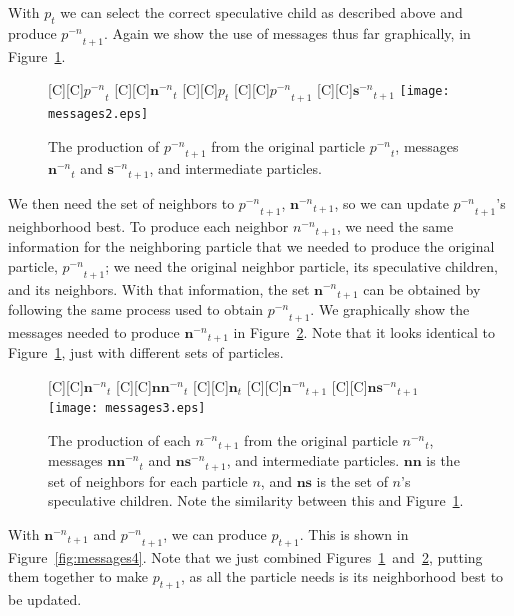 \documentclass[journal,letterpaper]{IEEEtran}
\newcommand{\fig}[1]{Figure~\ref{fig:#1}}
\providecommand{\nonbest}[1]{\ensuremath{#1^{-n}}}
\providecommand{\p}{\ensuremath{p}}
\providecommand{\sset}{\ensuremath{\mathbf{s}}}
\providecommand{\nsset}{\ensuremath{\mathbf{ns}}}
\providecommand{\n}{\ensuremath{n}}
\providecommand{\nset}{\ensuremath{\mathbf{n}}}
\providecommand{\nnset}{\ensuremath{\mathbf{nn}}}
\begin{document}
With $\p_t$ we can select the correct speculative child as described above and
produce $\nonbest{\p}_{t+1}$.  Again we show the use of messages thus far
graphically, in \fig{messages2}.  

\begin{figure}
  \centering
  [C][C]{$\nonbest{\p}_{t}$}
  [C][C]{$\nonbest{\nset}_{t}$}
  [C][C]{$\p_{t}$}
  [C][C]{$\nonbest{\p}_{t+1}$}
  [C][C]{$\nonbest{\sset}_{t+1}$}
  \texttt{[image: messages2.eps]}
  \caption{The production of $\nonbest{\p}_{t+1}$ from the original particle 
  $\nonbest{\p}_{t}$, messages $\nonbest{\nset}_{t}$ and
  $\nonbest{\sset}_{t+1}$, and intermediate particles.}
  \label{fig:messages2}
\end{figure}

We then need the set of neighbors to $\nonbest{\p}_{t+1}$,
$\nonbest{\nset}_{t+1}$, so we can update $\nonbest{\p}_{t+1}$'s neighborhood
best.  To produce each neighbor $\nonbest{\n}_{t+1}$, we need the same
information for the neighboring particle that we needed to produce the original
particle, $\nonbest{\p}_{t+1}$; we need the original neighbor particle, its
speculative children, and its neighbors.  With that information, the set
$\nonbest{\nset}_{t+1}$ can be obtained by following the same process used to
obtain $\nonbest{\p}_{t+1}$.  We graphically show the messages needed to
produce $\nonbest{\nset}_{t+1}$ in \fig{messages3}.  Note that it looks
identical to \fig{messages2}, just with different sets of particles.

\begin{figure}
  \centering
  [C][C]{$\nonbest{\nset}_{t}$}
  [C][C]{$\nonbest{\nnset}_{t}$}
  [C][C]{$\nset_{t}$}
  [C][C]{$\nonbest{\nset}_{t+1}$}
  [C][C]{$\nonbest{\nsset}_{t+1}$}
  \texttt{[image: messages3.eps]}
  \caption{The production of each $\nonbest{\n}_{t+1}$ from the original
  particle $\nonbest{\n}_{t}$, messages $\nonbest{\nnset}_{t}$ and
  $\nonbest{\nsset}_{t+1}$, and intermediate particles.  $\nnset$ is the set of
  neighbors for each particle $\n$, and $\nsset$ is the set of $\n$'s
  speculative children.  Note the similarity between this and \fig{messages2}.}
  \label{fig:messages3}
\end{figure}

With $\nonbest{\nset}_{t+1}$ and $\nonbest{\p}_{t+1}$, we can produce
$\p_{t+1}$.  This is shown in \fig{messages4}.  Note that we just combined
Figures~\ref{fig:messages2}~and~\ref{fig:messages3}, putting them together
to make $\p_{t+1}$, as all the particle needs is its neighborhood best to be
updated.
\end{document}
